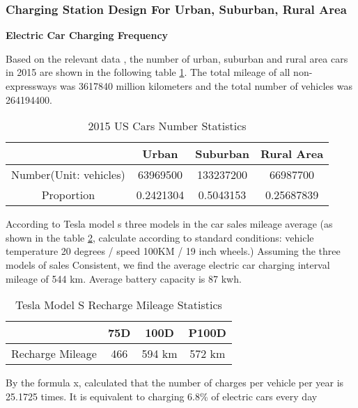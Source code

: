 \documentclass{mcmthesis}
\begin{document}
\subsubsection{Charging Station Design For Urban, Suburban, Rural Area}

\textbf{Electric Car Charging Frequency}

\par Based on the relevant data , the number of urban, suburban and rural area cars in 2015 are shown in the following table \ref{tab:2015 US Cars Number Statistics}. The total mileage of all non-expressways was 3617840 million kilometers and the total number of vehicles was 264194400.
\begin{table}[h]
\centering
\caption{2015 US Cars Number Statistics}\label{tab:2015 US Cars Number Statistics}
\begin{tabular}{c|ccc}
\toprule
 & Urban & Suburban & Rural Area\\
\midrule
Number(Unit: vehicles) & 63969500 &  133237200 & 66987700 \\
Proportion & 0.2421304 & 0.5043153 & 0.25687839 \\
\bottomrule
\end{tabular}
\end{table}


\par According to Tesla model s three models in the car sales mileage average (as shown in the table \ref{tab:Tesla Model S Recharge Mileage Statistics}, calculate according to standard conditions: vehicle temperature 20 degrees / speed 100KM / 19 inch wheels.) Assuming the three models of sales Consistent, we find the average electric car charging interval mileage of 544 km. Average battery capacity is 87 kwh.

\begin{table}[h]
\centering
\caption{Tesla Model S Recharge Mileage Statistics}\label{tab:Tesla Model S Recharge Mileage Statistics}
\begin{tabular}{c|ccc}
\toprule
 & 75D & 100D & P100D\\
\midrule
Recharge Mileage & 466  &  594 km & 572 km \\
\bottomrule
\end{tabular}
\end{table}
   
   
By the formula x, calculated that the number of charges per vehicle per year is 25.1725 times. It is equivalent to charging 6.8\% of electric cars every day
\end{document}
